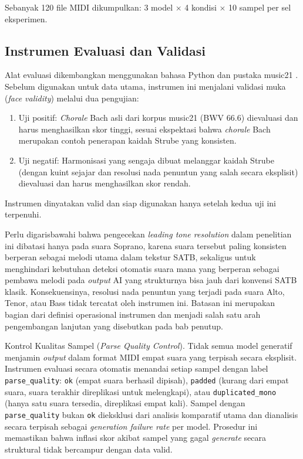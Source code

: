 Sebanyak 120 file MIDI dikumpulkan: 3 model $\times$ 4 kondisi $\times$ 10 sampel per sel eksperimen.

\subsection{Instrumen Evaluasi dan Validasi}

Alat evaluasi dikembangkan menggunakan bahasa Python dan pustaka music21 \parencite{cuthbert2010}. Sebelum digunakan untuk data utama, instrumen ini menjalani validasi muka (\textit{face validity}) melalui dua pengujian:

\begin{enumerate}
    \item Uji positif: \textit{Chorale} Bach asli dari korpus music21 (BWV 66.6) dievaluasi dan harus menghasilkan skor tinggi, sesuai ekspektasi bahwa \textit{chorale} Bach merupakan contoh penerapan kaidah Strube yang konsisten.
    \item Uji negatif: Harmonisasi yang sengaja dibuat melanggar kaidah Strube (dengan kuint sejajar dan resolusi nada penuntun yang salah secara eksplisit) dievaluasi dan harus menghasilkan skor rendah.
\end{enumerate}

Instrumen dinyatakan valid dan siap digunakan hanya setelah kedua uji ini terpenuhi.

Perlu digarisbawahi bahwa pengecekan \textit{leading tone resolution} dalam penelitian ini dibatasi hanya pada suara Soprano, karena suara tersebut paling konsisten berperan sebagai melodi utama dalam tekstur SATB, sekaligus untuk menghindari kebutuhan deteksi otomatis suara mana yang berperan sebagai pembawa melodi pada \textit{output} AI yang strukturnya bisa jauh dari konvensi SATB klasik. Konsekuensinya, resolusi nada penuntun yang terjadi pada suara Alto, Tenor, atau Bass tidak tercatat oleh instrumen ini. Batasan ini merupakan bagian dari definisi operasional instrumen dan menjadi salah satu arah pengembangan lanjutan yang disebutkan pada bab penutup.

Kontrol Kualitas Sampel (\textit{Parse Quality Control}). Tidak semua model generatif menjamin \textit{output} dalam format MIDI empat suara yang terpisah secara eksplisit. Instrumen evaluasi secara otomatis menandai setiap sampel dengan label \texttt{parse\_quality}: \texttt{ok} (empat suara berhasil dipisah), \texttt{padded} (kurang dari empat suara, suara terakhir direplikasi untuk melengkapi), atau \texttt{duplicated\_mono} (hanya satu suara tersedia, direplikasi empat kali). Sampel dengan \texttt{parse\_quality} bukan \texttt{ok} dieksklusi dari analisis komparatif utama dan dianalisis secara terpisah sebagai \textit{generation failure rate} per model. Prosedur ini memastikan bahwa inflasi skor akibat sampel yang gagal \textit{generate} secara struktural tidak bercampur dengan data valid.


